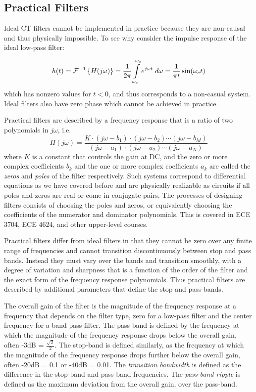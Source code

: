 \subsection{Practical Filters}

Ideal CT filters cannot be implemented in practice because they are non-causal and thus physically impossible. To see why consider the impulse response of the ideal low-pass filter:

\[
h(t) = \mathcal{F}^{-1} \left\{ H(j\omega) \right\} = \frac{1}{2\pi} \int\limits_{\-\omega_c}^{\omega_c} e^{j\omega t} \; d\omega = \frac{1}{\pi t}\sin(\omega_c t) 
\]
which has nonzero values for $t < 0$, and thus corresponds to a non-casual system. Ideal filters also have zero phase which cannot be achieved in practice.

Practical filters are described by a frequency response that is a ratio of two polynomials in $j\omega$, i.e.
\[
H(j\omega) = \frac{K \cdot(j\omega - b_1)\cdot(j\omega - b_2)\cdots (j\omega - b_M)}{(j\omega - a_1)\cdot(j\omega - a_2)\cdots (j\omega - a_N)}
\]
where $K$ is a constant that controls the gain at DC, and the zero or more complex coefficients $b_k$ and the one or more complex coefficients $a_k$ are called the \emph{zeros} and \emph{poles} of the filter respectively. Such systems correspond to differential equations as we have covered before and are physically realizable as circuits if all poles and zeros are real or come in conjugate pairs. The processes of designing filters consists of choosing the poles and zeros, or equivalently choosing the coefficients of the numerator and dominator polynomials. This is covered in ECE 3704, ECE 4624, and other upper-level courses. 

Practical filters differ from ideal filters in that they cannot be zero over any finite range of frequencies and cannot transition discontinuously between stop and pass bands. Instead they must vary over the bands and transition smoothly, with a degree of variation and sharpness that is a function of the order of the filter and the exact form of the frequency response polynomials. Thus practical filters are described by additional parameters that define the stop and pass-bands.

The overall gain of the filter is the magnitude of the frequency response at a frequency that depends on the filter type, zero for a low-pass filter and the center frequency for a band-pass filter. The pass-band is defined by the frequency at which the magnitude of the frequency response drops below the overall gain, often -3dB = $\frac{\sqrt{2}}{2}$. The stop-band is defined similarly, as the frequency at which the magnitude of the frequency response drops further below the overall gain, often -20dB = 0.1 or -40dB = 0.01. The \emph{transition bandwidth} is defined as the difference in the stop-band and pass-band frequencies. The \emph{pass-band ripple} is defined as the maximum deviation from the overall gain, over the pass-band.

